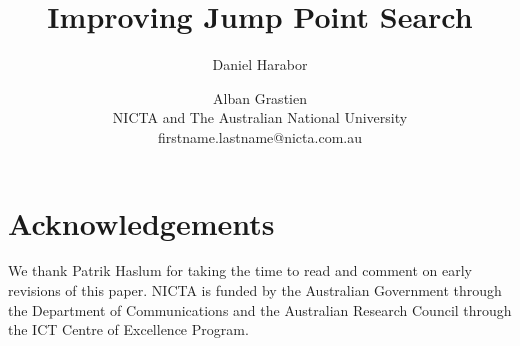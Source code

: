 \documentclass[letterpaper]{article}
\begin{document}
\title{Improving Jump Point Search}
\author{
Daniel Harabor \and Alban Grastien \\
NICTA and The Australian National University \\
firstname.lastname@nicta.com.au}

\maketitle





%






%

\section{Acknowledgements}

We thank Patrik Haslum for taking the time to read and comment on 
early revisions of this paper.
NICTA is funded by the Australian Government through the Department of
Communications and the Australian Research Council through the ICT Centre of
Excellence Program.

%


\end{document}
